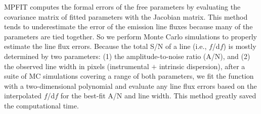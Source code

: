 \documentclass[iop,revtex4,twocolumn,apj,numberedappendix,appendixfloats]{emulateapj}
\begin{document}
MPFIT computes the formal errors of the free parameters by evaluating the covariance matrix of fitted parameters with the Jacobian matrix. This method tends to underestimate the error of the emission line fluxes because many of the parameters are tied together. So we perform Monte Carlo simulations to properly estimate the line flux errors. Because the total S/N of a line (i.e., $f$/d$f$) is mostly determined by two parameters: (1) the amplitude-to-noise ratio (A/N), and (2) the observed line width in pixels (instrumental $+$ intrinsic dispersion), after a suite of MC simulations covering a range of both parameters, we fit the function with a two-dimensional polynomial and evaluate any line flux errors based on the interpolated $f$/d$f$ for the best-fit A/N and line width. This method greatly saved the computational time.



\end{document}
